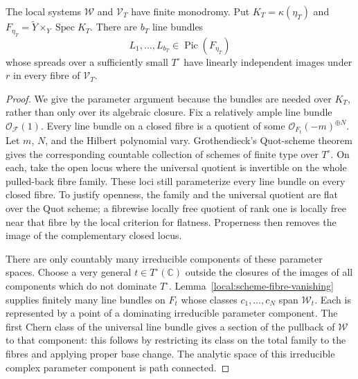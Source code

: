 \begin{lemma}\label{local:generic-lines}
The local systems $\mathcal W$ and $\mathcal V_T$ have finite
monodromy.  Put $K_T=\kappa(\eta_T)$ and
$F_{\eta_T}=\widetilde Y\times_Y\operatorname{Spec}K_T$.  There are
$b_T$ line bundles
\[
 L_1,\ldots,L_{b_T}\in\operatorname{Pic}(F_{\eta_T})
\]
whose spreads over a sufficiently small $T^\circ$ have linearly
independent images under $r$ in every fibre of $\mathcal V_T$.
\end{lemma}

\begin{proof}
We give the parameter argument because the bundles are needed over
$K_T$, rather than only over its algebraic closure.  Fix a relatively
ample line bundle $\mathcal O_{\mathcal F}(1)$.  Every line bundle on
a closed fibre is a quotient of some
$\mathcal O_{F_t}(-m)^{\oplus N}$.  Let $m$, $N$, and the Hilbert
polynomial vary. Grothendieck's Quot-scheme theorem
\cite[Theorems~3.1--3.2]{GrothendieckHilbert1961} gives the
corresponding countable collection of schemes of finite type over $T^\circ$.
On each, take the open locus where the universal quotient is
invertible on the whole pulled-back fibre family.  These loci still
parameterize every line bundle on every closed fibre.  To justify
openness, the family and the universal quotient are flat over the
Quot scheme; a fibrewise locally free quotient of rank one is locally
free near that fibre by the local criterion for flatness.  Properness
then removes the image of the complementary closed locus.

There are only countably many irreducible components of these
parameter spaces.  Choose a very general $t\in T^\circ(\mathbb C)$
outside the closures of the images of all components which do not
dominate $T^\circ$.  Lemma~\ref{local:scheme-fibre-vanishing} supplies
finitely many line bundles on $F_t$ whose classes
$c_1,\ldots,c_N$ span $\mathcal W_t$.  Each is represented by a point
of a dominating irreducible parameter component.  The first Chern
class of the universal line bundle gives a section of the pullback
of $\mathcal W$ to that component: this follows by restricting its
class on the total family to the fibres and applying proper base
change.  The analytic space of this irreducible complex parameter
component is path connected.


\end{proof}
